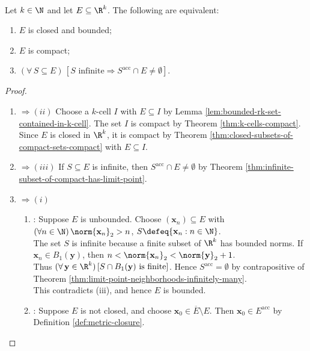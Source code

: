 \begin{theorem} \label{thm:heine-borel-rk} \\
Let $k\in\N$ and let $E\subseteq\R^k$. The following are equivalent:
\begin{enumerate}[label=(\roman*)]
\setlength{\itemsep}{0pt}
\item $E$ is closed and bounded;
\item $E$ is compact;
\item $(\forall\,S\subseteq E)\,[S\text{ infinite}\Longrightarrow S^{\operatorname{acc}}\cap E\ne\emptyset]$.
\end{enumerate}
\begin{proof}
\begin{enumerate}[label=(\roman*)]
\setlength{\itemsep}{0pt}
\item[$(i)$]$\Rightarrow (ii)$ Choose a $k$-cell $I$ with $E\subseteq I$ by Lemma \ref{lem:bounded-rk-set-contained-in-k-cell}. The set $I$ is compact by Theorem \ref{thm:k-cells-compact}.\\
Since $E$ is closed in $\R^k$, it is compact by Theorem \ref{thm:closed-subsets-of-compact-sets-compact} with $E\subseteq I$.
\item[$(ii)$]$\Rightarrow (iii)$ If $S\subseteq E$ is infinite, then $S^{\operatorname{acc}}\cap E\ne\emptyset$ by Theorem \ref{thm:infinite-subset-of-compact-has-limit-point}.\\
\item[$(iii)$]$\Rightarrow (i)$
\begin{enumerate}[label=(\alph*)]
\setlength{\itemsep}{0pt}
\item {}: Suppose $E$ is unbounded. Choose $(\mathbf{x}_n)\subseteq E$ with $(\forall n\in\N)\,\norm{\mathbf{x}_n}_2>n$, $S\defeq\{\mathbf{x}_n:n\in\N\}$.\\
The set $S$ is infinite because a finite subset of $\R^k$ has bounded norms. If $\mathbf{x}_n\in B_1(\mathbf{y})$, then $n<\norm{\mathbf{x}_n}_2<\norm{\mathbf{y}}_2+1$.\\
Thus $(\forall\,\mathbf{y}\in\R^k)\,[S\cap B_1(\mathbf{y})\text{ is finite}]$. Hence $S^{\operatorname{acc}}=\emptyset$ by contrapositive of Theorem \ref{thm:limit-point-neighborhoods-infinitely-many}.\\
This contradicts (iii), and hence $E$ is bounded.
\item {}: Suppose $E$ is not closed, and choose $\mathbf{x}_0\in\overline{E}\setminus E$. Then $\mathbf{x}_0\in E^{\operatorname{acc}}$ by Definition \ref{def:metric-closure}.\\

\end{enumerate}
\end{enumerate}
\end{proof}
\end{theorem}
